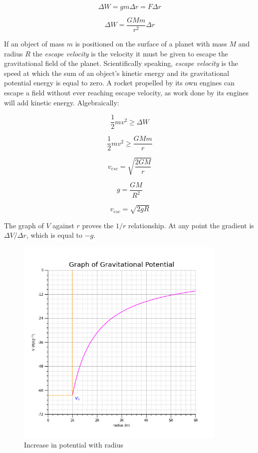 \documentclass[12pt]{article}
\begin{document}
\[\Delta W = gm \Delta r = F \Delta r  \]

\[ \Delta W = \dfrac{GMm}{r^2} \Delta r \]

If an object of mass \(m\) is positioned on the surface of a planet with mass \(M\) and radius \(R\) the \emph{escape velocity} is the velocity it must be given to escape the gravitational field of the planet. Scientifically speaking, \emph{escape velocity} is the speed at which the sum of an object's kinetic energy and its gravitational potential energy is equal to zero. A rocket propelled by its own engines can escape a field without ever reaching escape velocity, as work done by its engines will add kinetic energy. Algebraically:

\[\dfrac{1}{2} m v^2 \ge \Delta W\]

\[\dfrac{1}{2} m v^2 \ge \dfrac{GMm}{r}\]

\[ v_{esc} = \sqrt{\dfrac{2GM}{r}}\]

\[g = \dfrac{GM}{R^2}\]

\[ v_{esc} = \sqrt{2gR}\]


The graph of \(V\) against \(r\) proves the \(1/r\) relationship. At any point the gradient is \(\Delta V / \Delta r\), which is equal to \(-g\).

\begin{figure}[H]
\centering
\includegraphics[width=0.9\textwidth,keepaspectratio]{./images/gravitational_potential.png}
\caption{Increase in potential with radius}
\end{figure}
\end{document}
